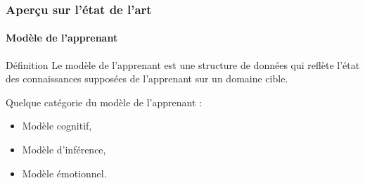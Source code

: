 \documentclass[aspectratio=169,professionalfonts, 12pt]{beamer}
\begin{document}
\begin{frame}
  \frametitle{Aperçu sur l'état de l'art}
  \framesubtitle{Modèle de l’apprenant}
  \justifying 
  \begin{minipage}{\textwidth}
  \begin{block}{Définition}
    Le modèle de l’apprenant est une structure de données qui reflète l’état des connaissances supposées de l’apprenant sur un domaine cible.
  \end{block}
  \end{minipage} 
  \begin{minipage}{\textwidth}
  \begin{block}{}
    Quelque catégorie du modèle de l’apprenant :
    \begin{itemize}
      \item Modèle cognitif,
      \item Modèle d’inférence,
      \item Modèle émotionnel.
    \end{itemize}
  \end{block}
  \end{minipage}
\end{frame}


\end{document}
